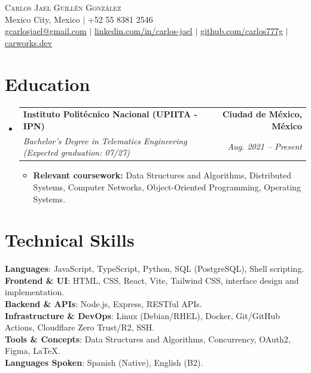 \documentclass[letterpaper,11pt]{article}
\makeatletter
\newcommand{\resumeItem}[1]{
  \item\small{
    {#1 \vspace{-2pt}}
  }
}
\newcommand{\resumeSubheading}[4]{
  \vspace{-2pt}\item
    \begin{tabular*}{1.0\textwidth}[t]{l@{\extracolsep{\fill}}r}
      \textbf{#1} & \textbf{\small #2} \\
      \textit{\small#3} & \textit{\small #4} \\
    \end{tabular*}\vspace{-7pt}
}
\newcommand{\resumeSubHeadingListStart}{\begin{itemize}[leftmargin=0.0in, label={}]}
\newcommand{\resumeSubHeadingListEnd}{\end{itemize}}
\newcommand{\resumeItemListStart}{\begin{itemize}}
\newcommand{\resumeItemListEnd}{\end{itemize}\vspace{-5pt}}
\makeatother
\begin{document}
\begin{center}
  {\Huge \scshape Carlos Jael Guillén González} \\ \vspace{2pt}
  Mexico City, Mexico $\vert$ +52 55 8381 2546 \\ \vspace{2pt}
  \href{mailto:gcarlosjael@gmail.com}{gcarlosjael@gmail.com} $\vert$
  \href{https://www.linkedin.com/in/carlos-jael-guill%C3%A9n-gonz%C3%A1lez/}{linkedin.com/in/carlos-jael} $\vert$
  \href{https://github.com/carlos777g}{github.com/carlos777g} $\vert$
  \href{https://carworks.dev}{carworks.dev}
  \vspace{-8pt}
\end{center}

\section{Education}
\resumeSubHeadingListStart
  \resumeSubheading
    {Instituto Politécnico Nacional (UPIITA - IPN)}{Ciudad de México, México}
    {Bachelor's Degree in Telematics Engineering (Expected graduation: 07/27)}{Aug. 2021 -- Present}
    \resumeItemListStart
      \resumeItem{\textbf{Relevant coursework:} Data Structures and Algorithms, Distributed Systems, Computer Networks, Object-Oriented Programming, Operating Systems.}
    \resumeItemListEnd
\resumeSubHeadingListEnd

\section{Technical Skills}
\begin{itemize}[leftmargin=0.15in, label={}]
  \small{\item{
    \textbf{Languages}{: JavaScript, TypeScript, Python, SQL (PostgreSQL), Shell scripting.} \\
    \textbf{Frontend \& UI}{: HTML, CSS, React, Vite, Tailwind CSS, interface design and implementation.} \\
    \textbf{Backend \& APIs}{: Node.js, Express, RESTful APIs.} \\
    \textbf{Infrastructure \& DevOps}{: Linux (Debian/RHEL), Docker, Git/GitHub Actions, Cloudflare Zero Trust/R2, SSH.} \\
    \textbf{Tools \& Concepts}{: Data Structures and Algorithms, Concurrency, OAuth2, Figma, LaTeX.} \\
    \textbf{Languages Spoken}{: Spanish (Native), English (B2).}
  }}
\end{itemize}
\end{document}
